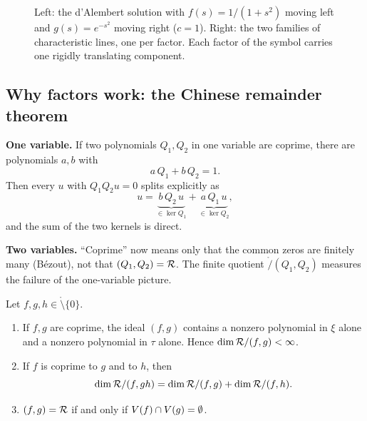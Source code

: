 \begin{figure}[!htb]
\centering
{}
\hfill
{}
\caption{Left: the d'Alembert solution with $f(s)=1/(1+s^2)$ moving left and $g(s)=e^{-s^2}$ moving right ($c=1$). Right: the two families of characteristic lines, one per factor. Each factor of the symbol carries one rigidly translating component.}\label{fig:wave}
\end{figure}

\subsection{Why factors work: the Chinese remainder theorem}

\textbf{One variable.} If two polynomials $Q_1,Q_2$ in one variable are coprime, there are polynomials $a,b$ with
\[
a\,Q_1+b\,Q_2=1 .
\]
Then every $u$ with $Q_1Q_2u=0$ splits explicitly as
\[
u=\underbrace{b\,Q_2\,u}_{\in\ker Q_1}+\underbrace{a\,Q_1\,u}_{\in\ker Q_2},
\]
and the sum of the two kernels is direct.

\textbf{Two variables.} ``Coprime'' now means only that the common zeros are finitely many (B\'ezout), not that $(Q_1,Q_2)=\mathcal{R}$. The finite quotient $\ring/(Q_1,Q_2)$ measures the failure of the one-variable picture.

\begin{lemma}\label{lem:C12L3}
Let $f,g,h\in\ring\setminus\{0\}$.
\begin{enumerate}[label=(\alph*)]
\item If $f,g$ are coprime, the ideal $(f,g)$ contains a nonzero polynomial in $\xi$ alone and a nonzero polynomial in $\tau$ alone. Hence $\operatorname{dim}\mathcal{R}/(f,g)<\infty$.
\item If $f$ is coprime to $g$ and to $h$, then
\[
\operatorname{dim}\mathcal{R}/(f,gh)=\operatorname{dim}\mathcal{R}/(f,g)+\operatorname{dim}\mathcal{R}/(f,h).
\]
\item $(f,g)=\mathcal{R}$ if and only if $V(f)\cap V(g)=\emptyset$.
\end{enumerate}
\end{lemma}

